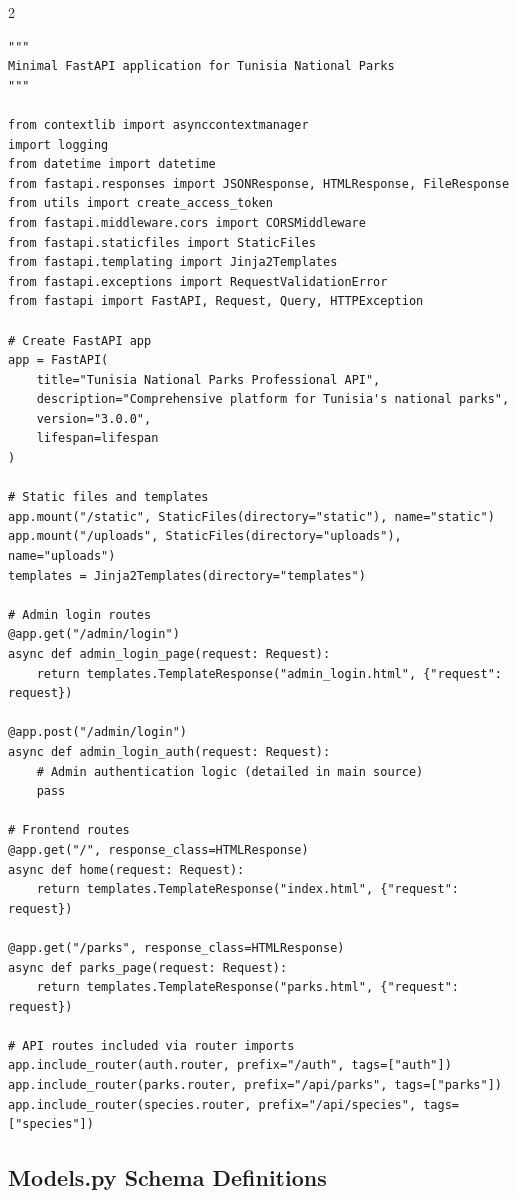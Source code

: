 \documentclass[11pt,a4paper]{article}
\begin{document}
\begin{multicols}{2}
\begin{lstlisting}[caption=Main.py Application Structure]
"""
Minimal FastAPI application for Tunisia National Parks
"""

from contextlib import asynccontextmanager
import logging
from datetime import datetime
from fastapi.responses import JSONResponse, HTMLResponse, FileResponse
from utils import create_access_token
from fastapi.middleware.cors import CORSMiddleware
from fastapi.staticfiles import StaticFiles
from fastapi.templating import Jinja2Templates
from fastapi.exceptions import RequestValidationError
from fastapi import FastAPI, Request, Query, HTTPException

# Create FastAPI app
app = FastAPI(
    title="Tunisia National Parks Professional API",
    description="Comprehensive platform for Tunisia's national parks",
    version="3.0.0",
    lifespan=lifespan
)

# Static files and templates
app.mount("/static", StaticFiles(directory="static"), name="static")
app.mount("/uploads", StaticFiles(directory="uploads"), name="uploads")
templates = Jinja2Templates(directory="templates")

# Admin login routes
@app.get("/admin/login")
async def admin_login_page(request: Request):
    return templates.TemplateResponse("admin_login.html", {"request": request})

@app.post("/admin/login")
async def admin_login_auth(request: Request):
    # Admin authentication logic (detailed in main source)
    pass

# Frontend routes
@app.get("/", response_class=HTMLResponse)
async def home(request: Request):
    return templates.TemplateResponse("index.html", {"request": request})

@app.get("/parks", response_class=HTMLResponse)
async def parks_page(request: Request):
    return templates.TemplateResponse("parks.html", {"request": request})

# API routes included via router imports
app.include_router(auth.router, prefix="/auth", tags=["auth"])
app.include_router(parks.router, prefix="/api/parks", tags=["parks"])
app.include_router(species.router, prefix="/api/species", tags=["species"])
\end{lstlisting}
\end{multicols}

\subsection{Models.py Schema Definitions}
\end{document}
